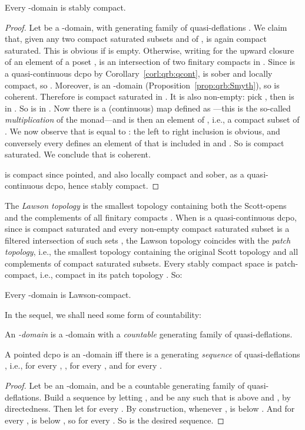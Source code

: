 \documentclass{LMCS}
\begin{document}
\begin{thm}
  \label{thm:qrb:scomp}
  Every -domain is stably compact.
\end{thm}
\begin{proof}
  Let  be a -domain, with generating family of
  quasi-deflations .  We claim that, given
  any two compact saturated subsets  and  of , 
  is again compact saturated.  This is obvious if  is
  empty.  Otherwise, writing  for the upward closure of an
  element  of a poset ,  is an intersection of two finitary compacts in .
  Since  is a quasi-continuous dcpo by
  Corollary~\ref{corl:qrb:qcont},  is sober and locally compact, so
  .  Moreover,  is an
  -domain (Proposition~\ref{prop:qrb:Smyth}), so  is
  coherent.  Therefore 
  is compact saturated in .  It is also non-empty: pick , then  is in .  So  is in .  Now there is a (continuous)
  map  defined as ---this is the so-called {\em multiplication\/} of
  the monad---and  is then an element of , i.e., a compact subset of
  .  We now observe that  is equal to : the left to
  right inclusion is obvious, and conversely every 
  defines an element  of  that is included
  in  and .  So  is compact saturated.  We conclude
  that  is coherent.

   is compact since pointed, and also locally compact and sober, as
  a quasi-continuous dcpo, hence stably compact.  \end{proof}


The {\em Lawson topology\/} is the smallest topology containing both
the Scott-opens and the complements of all finitary compacts .  When  is a quasi-continuous dcpo, since  is
compact saturated and every non-empty compact saturated subset is a
filtered intersection of such sets , the Lawson topology
coincides with the {\em patch topology\/}, i.e., the smallest topology
containing the original Scott topology and all complements of compact
saturated subsets.  Every stably compact space is patch-compact, i.e.,
compact in its patch topology
\cite[Section~VI-6]{GHKLMS:contlatt}.  So:
\begin{cor}
  \label{corl:qrb:lcomp}
  Every -domain is Lawson-compact.
\end{cor}

In the sequel, we shall need some form of countability:
\begin{defi} \label{defn:omega:qrb}
  An {\em -domain\/} is a -domain with a {\em
    countable\/} generating family of quasi-deflations.
\end{defi}

\begin{prop}
  \label{prop:omega:qrb}
  A pointed dcpo  is an -domain iff there is a
  generating {\em sequence\/} of quasi-deflations , i.e., for every , ,
   for every , and
   for every
  .
\end{prop}
\begin{proof}
  Let  be an -domain, and  be
  a countable generating family of quasi-deflations.  Build a sequence
   by letting , and  be any  such that  is above  and , by
  directedness.  Then let  for every .  By construction, whenever ,  is below
  .  And for every ,  is below
  , so  for every .  So
   is the desired sequence.
\end{proof}
\end{document}
